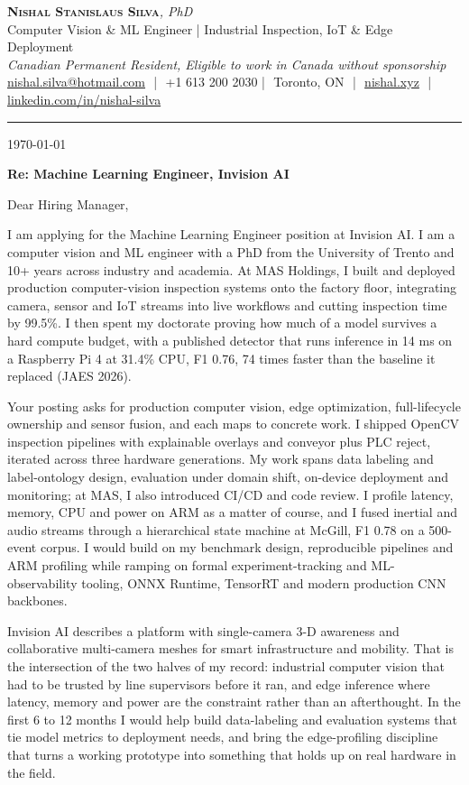 \documentclass[11pt]{article}
\makeatletter
\newcommand{\clName}{Nishal Stanislaus Silva}
\newcommand{\clEmail}{nishal.silva@hotmail.com}
\newcommand{\clPhone}{+1 613 200 2030}
\newcommand{\clCity}{Toronto, ON}
\newcommand{\clSite}{https://nishal.xyz}
\newcommand{\clLinkedIn}{https://www.linkedin.com/in/nishal-silva}
\newcommand{\clStatus}{Canadian Permanent Resident, Eligible to work in Canada without sponsorship}
\newcommand{\clTagline}{Computer Vision \& ML Engineer | Industrial Inspection, IoT \& Edge Deployment}
\newcommand{\clRole}{Machine Learning Engineer}
\newcommand{\clCompany}{Invision AI}
\newcommand{\clAddressee}{Dear Hiring Manager,}
\makeatother
\begin{document}
\pagestyle{empty}
\begin{center}
    {\LARGE \scshape \textbf{\clName}}{\large \textit{, PhD}}\\[1pt]
    {\small \clTagline}\\[1pt]
    {\footnotesize\textit{\clStatus}}\\[1pt]
    {\small
    \href{mailto:\clEmail}{\clEmail} \,\,|\,\, \clPhone \,\,|\,\, \clCity
    \,\,|\,\, \href{\clSite}{nishal.xyz} \,\,|\,\, \href{\clLinkedIn}{linkedin.com/in/nishal-silva}}
\end{center}

\rule{\linewidth}{0.4pt}\vspace{0.6em}

\today

\textbf{Re: \clRole{}, \clCompany{}}

\clAddressee

I am applying for the Machine Learning Engineer position at Invision AI. I am a computer vision and ML engineer with a PhD from the University of Trento and 10+ years across industry and academia. At MAS Holdings, I built and deployed production computer-vision inspection systems onto the factory floor, integrating camera, sensor and IoT streams into live workflows and cutting inspection time by 99.5\%. I then spent my doctorate proving how much of a model survives a hard compute budget, with a published detector that runs inference in 14 ms on a Raspberry Pi 4 at 31.4\% CPU, F1 0.76, 74 times faster than the baseline it replaced (JAES 2026).

Your posting asks for production computer vision, edge optimization, full-lifecycle ownership and sensor fusion, and each maps to concrete work. I shipped OpenCV inspection pipelines with explainable overlays and conveyor plus PLC reject, iterated across three hardware generations. My work spans data labeling and label-ontology design, evaluation under domain shift, on-device deployment and monitoring; at MAS, I also introduced CI/CD and code review. I profile latency, memory, CPU and power on ARM as a matter of course, and I fused inertial and audio streams through a hierarchical state machine at McGill, F1 0.78 on a 500-event corpus. I would build on my benchmark design, reproducible pipelines and ARM profiling while ramping on formal experiment-tracking and ML-observability tooling, ONNX Runtime, TensorRT and modern production CNN backbones.

Invision AI describes a platform with single-camera 3-D awareness and collaborative multi-camera meshes for smart infrastructure and mobility. That is the intersection of the two halves of my record: industrial computer vision that had to be trusted by line supervisors before it ran, and edge inference where latency, memory and power are the constraint rather than an afterthought. In the first 6 to 12 months I would help build data-labeling and evaluation systems that tie model metrics to deployment needs, and bring the edge-profiling discipline that turns a working prototype into something that holds up on real hardware in the field.
\end{document}
